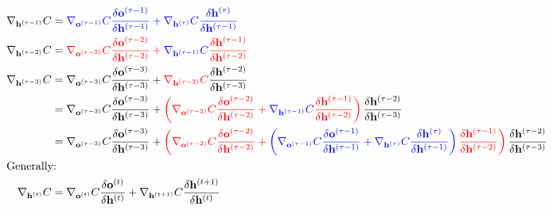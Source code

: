 \documentclass[12pt]{article}
\begin{document}
\begin{align}
    \nabla_{\mathbf{h}^{(\tau-1)}} C &= \color{blue}\nabla_{\mathbf{o}^{(\tau-1)}}C \frac{\delta \mathbf{o}^{(\tau-1)}}{\delta \mathbf{h}^{(\tau-1)}} + \nabla_{\mathbf{h}^{(\tau)}}C \frac{\delta \mathbf{h}^{(\tau)}}{\delta \mathbf{h}^{(\tau-1)}} \\
    \nabla_{\mathbf{h}^{(\tau-2)}} C &= \color{red}\nabla_{\mathbf{o}^{(\tau-2)}}C \frac{\delta \mathbf{o}^{(\tau-2)}}{\delta \mathbf{h}^{(\tau-2)}} + \color{blue}\nabla_{\mathbf{h}^{(\tau-1)}}C \color{red} \frac{\delta \mathbf{h}^{(\tau-1)}}{\delta \mathbf{h}^{(\tau-2)}} \\
    \nabla_{\mathbf{h}^{(\tau-3)}} C &= \nabla_{\mathbf{o}^{(\tau-3)}}C \frac{\delta \mathbf{o}^{(\tau-3)}}{\delta \mathbf{h}^{(\tau-3)}} + \color{red}\nabla_{\mathbf{h}^{(\tau-2)}}C \color{black} \frac{\delta \mathbf{h}^{(\tau-2)}}{\delta \mathbf{h}^{(\tau-3)}} \\
    &= \nabla_{\mathbf{o}^{(\tau-3)}}C \frac{\delta \mathbf{o}^{(\tau-3)}}{\delta \mathbf{h}^{(\tau-3)}} + \color{red}\left(\nabla_{\mathbf{o}^{(\tau-2)}}C \frac{\delta \mathbf{o}^{(\tau-2)}}{\delta \mathbf{h}^{(\tau-2)}} + \color{blue}\nabla_{\mathbf{h}^{(\tau-1)}}C\color{red} \frac{\delta \mathbf{h}^{(\tau-1)}}{\delta \mathbf{h}^{(\tau-2)}} \right) \color{black} \frac{\delta \mathbf{h}^{(\tau-2)}}{\delta \mathbf{h}^{(\tau-3)}} \\
    &= \nabla_{\mathbf{o}^{(\tau-3)}}C \frac{\delta \mathbf{o}^{(\tau-3)}}{\delta \mathbf{h}^{(\tau-3)}} + \color{red}\left(\nabla_{\mathbf{o}^{(\tau-2)}}C \frac{\delta \mathbf{o}^{(\tau-2)}}{\delta \mathbf{h}^{(\tau-2)}} + \color{blue}\left(\color{blue}\nabla_{\mathbf{o}^{(\tau-1)}}C \frac{\delta \mathbf{o}^{(\tau-1)}}{\delta \mathbf{h}^{(\tau-1)}} + \nabla_{\mathbf{h}^{(\tau)}}C \frac{\delta \mathbf{h}^{(\tau)}}{\delta \mathbf{h}^{(\tau-1)}} \right)\color{red} \frac{\delta \mathbf{h}^{(\tau-1)}}{\delta \mathbf{h}^{(\tau-2)}} \right) \color{black} \frac{\delta \mathbf{h}^{(\tau-2)}}{\delta \mathbf{h}^{(\tau-3)}} \\
    \shortintertext{Generally:}
    \nabla_{\mathbf{h}^{(t)}} C &= \nabla_{\mathbf{o}^{(t)}}C \frac{\delta \mathbf{o}^{(t)}}{\delta \mathbf{h}^{(t)}} + \nabla_{\mathbf{h}^{(t+1)}}C \frac{\delta \mathbf{h}^{(t+1)}}{\delta \mathbf{h}^{(t)}}
\end{align}\par
\end{document}
